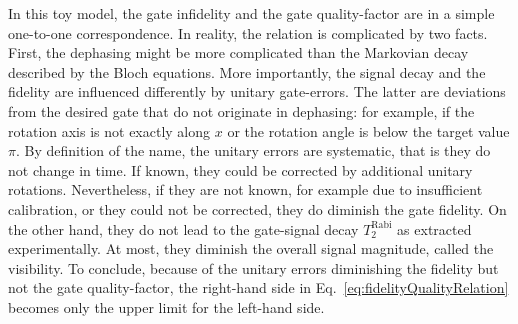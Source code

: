 \documentclass[aps, prx, showpacs, twocolumn, superscriptaddress, notitlepage, longbibliography, floatfix, nofootinbib]{revtex4-2}
\newcommand{\TRabi}{T_2^\mathrm{Rabi}}
\begin{document}
In this toy model, the gate infidelity and the gate quality-factor are in a simple one-to-one correspondence. In reality, the relation is complicated by two facts. First, the dephasing might be more complicated than the Markovian decay described by the Bloch equations. More importantly, the signal decay and the fidelity are influenced differently by unitary gate-errors. The latter are deviations from the desired gate that do not originate in dephasing: for example, if the rotation axis is not exactly along $x$ or the rotation angle is below the target value $\pi$. By definition of the name, the unitary errors are systematic, that is they do not change in time. If known, they could be corrected by additional unitary rotations. Nevertheless, if they are not known, for example due to insufficient calibration, or they could not be corrected, they do diminish the gate fidelity. On the other hand, they do not lead to the gate-signal decay $ \TRabi$ as extracted experimentally. At most, they diminish the overall signal magnitude, called the visibility.  To conclude, because of the unitary errors diminishing the fidelity but not the gate quality-factor, the right-hand side in Eq.~\eqref{eq:fidelityQualityRelation} becomes only the upper limit for the left-hand side. 
\end{document}
